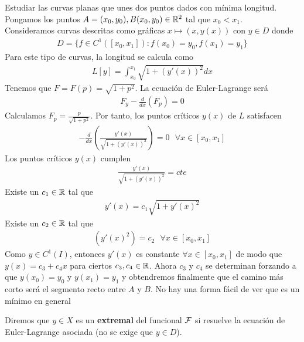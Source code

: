 \begin{ejemplo}
    Estudiar las curvas planas que unes dos puntos dados con mínima longitud. Pongamos los puntos $A=(x_0, y_0), B(x_0, y_0)\in \mathbb{R}^2$ tal que $x_0<x_1$.\\

    Consideramos curvas descritas como gráficas $x\mapsto (x, y(x))$ con $y\in D$ donde
    \begin{gather*}
        D=\{f\in C^1([x_0, x_1]) : f(x_0)=y_0, f(x_1)=y_1\}
    \end{gather*}
    Para este tipo de curvas, la longitud se calcula como 
    \begin{gather*}
        L[y] = \int_{x_0}^{x_1} \sqrt{1+(y'(x))^2} dx
    \end{gather*}
    Tenemos que $F=F(p) = \sqrt{1+p^2}$. La ecuación de Euler-Lagrange será 
    \begin{gather*}
        F_y - \frac{d}{dx}(F_p) = 0
    \end{gather*}
    Calculamos $F_p = \frac{p}{\sqrt{1+p^2}}$. Por tanto, los puntos críticos $y(x)$ de $L$ satisfacen
    \begin{gather*}
        -\frac{d}{dx} \left(\frac{y'(x)}{\sqrt{1+(y'(x))^2}}\right) = 0\ \ \ \forall x \in [x_0, x_1]
    \end{gather*}
    Los puntos críticos $y(x)$ cumplen 
    \begin{gather*}
        \frac{y'(x)}{\sqrt{1+(y'(x))^2}} = cte
    \end{gather*}
    Existe un $c_1\in \mathbb{R}$ tal que 
    \begin{gather*}
        y'(x) = c_1 \sqrt{1+y'(x)^2}
    \end{gather*}
    Existe un $c_2\in \mathbb{R}$ tal que 
    \begin{gather*}
        (y'(x)^2) = c_2\ \ \ \forall x \in [x_0, x_1]
    \end{gather*}
    Como $y\in C^1(I)$, entonces $y'(x)$ es constante $\forall x \in [x_0, x_1]$ de modo que $y(x) = c_3 + c_4x$ para ciertos $c_3, c_4\in \mathbb{R}$. Ahora $c_3$ y $c_4$ se determinan forzando a que $y(x_0)=y_0$ y $y(x_1)=y_1$ y obtendremos finalmente que el camino más corto será el segmento recto entre $A$ y $B$. No hay una forma fácil de ver que es un mínimo en general
\end{ejemplo}

\begin{definicion}
    Diremos que $y\in X$ es un \textbf{extremal} del funcional $\mathcal{F}$ si resuelve la ecuación de Euler-Lagrange asociada (no se exige que $y\in D$).
\end{definicion}


